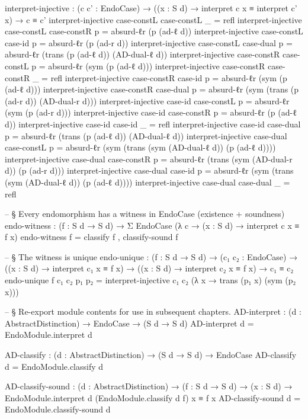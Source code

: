 \documentclass[11pt,a4paper]{book}
\begin{document}
\begin{code}
  interpret-injective :
    (c c' : EndoCase) →
    ((x : S d) → interpret c x ≡ interpret c' x) →
    c ≡ c'
  interpret-injective case-constL case-constL _ = refl
  interpret-injective case-constL case-constR p = absurd-ℓr (p (ad-ℓ d))
  interpret-injective case-constL case-id     p = absurd-ℓr (p (ad-r d))
  interpret-injective case-constL case-dual   p =
    absurd-ℓr (trans (p (ad-ℓ d)) (AD-dual-ℓ d))
  interpret-injective case-constR case-constL p =
    absurd-ℓr (sym (p (ad-ℓ d)))
  interpret-injective case-constR case-constR _ = refl
  interpret-injective case-constR case-id     p =
    absurd-ℓr (sym (p (ad-ℓ d)))
  interpret-injective case-constR case-dual   p =
    absurd-ℓr (sym (trans (p (ad-r d)) (AD-dual-r d)))
  interpret-injective case-id case-constL     p =
    absurd-ℓr (sym (p (ad-r d)))
  interpret-injective case-id case-constR     p =
    absurd-ℓr (p (ad-ℓ d))
  interpret-injective case-id case-id         _ = refl
  interpret-injective case-id case-dual       p =
    absurd-ℓr (trans (p (ad-ℓ d)) (AD-dual-ℓ d))
  interpret-injective case-dual case-constL   p =
    absurd-ℓr (sym (trans (sym (AD-dual-ℓ d)) (p (ad-ℓ d))))
  interpret-injective case-dual case-constR   p =
    absurd-ℓr (trans (sym (AD-dual-r d)) (p (ad-r d)))
  interpret-injective case-dual case-id       p =
    absurd-ℓr (sym (trans (sym (AD-dual-ℓ d)) (p (ad-ℓ d))))
  interpret-injective case-dual case-dual     _ = refl

  -- § Every endomorphism has a witness in EndoCase (existence + soundness)
  endo-witness : (f : S d → S d) →
                 Σ EndoCase (λ c → (x : S d) → interpret c x ≡ f x)
  endo-witness f = classify f , classify-sound f

  -- § The witness is unique
  endo-unique : (f : S d → S d) →
                (c₁ c₂ : EndoCase) →
                ((x : S d) → interpret c₁ x ≡ f x) →
                ((x : S d) → interpret c₂ x ≡ f x) →
                c₁ ≡ c₂
  endo-unique f c₁ c₂ p₁ p₂ =
    interpret-injective c₁ c₂
      (λ x → trans (p₁ x) (sym (p₂ x)))

-- § Re-export module contents for use in subsequent chapters.
AD-interpret : (d : AbstractDistinction) → EndoCase → (S d → S d)
AD-interpret d = EndoModule.interpret d

AD-classify : (d : AbstractDistinction) → (S d → S d) → EndoCase
AD-classify d = EndoModule.classify d

AD-classify-sound : (d : AbstractDistinction) → (f : S d → S d) →
                    (x : S d) → EndoModule.interpret d (EndoModule.classify d f) x ≡ f x
AD-classify-sound d = EndoModule.classify-sound d


\end{code}
\end{document}

